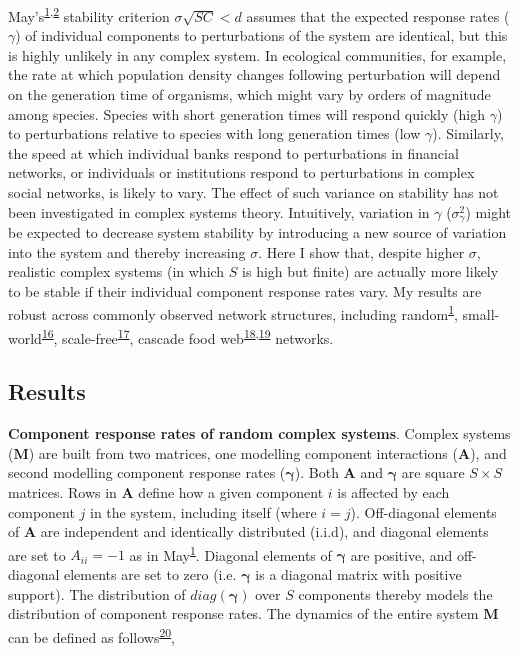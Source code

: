 \documentclass[]{article}
\begin{document}
May's\textsuperscript{\protect\hyperlink{ref-May1972}{1},\protect\hyperlink{ref-Allesina2012}{2}}
stability criterion \(\sigma\sqrt{SC} < d\) assumes that the expected
response rates (\(\gamma\)) of individual components to perturbations of
the system are identical, but this is highly unlikely in any complex
system. In ecological communities, for example, the rate at which
population density changes following perturbation will depend on the
generation time of organisms, which might vary by orders of magnitude
among species. Species with short generation times will respond quickly
(high \(\gamma\)) to perturbations relative to species with long
generation times (low \(\gamma\)). Similarly, the speed at which
individual banks respond to perturbations in financial networks, or
individuals or institutions respond to perturbations in complex social
networks, is likely to vary. The effect of such variance on stability
has not been investigated in complex systems theory. Intuitively,
variation in \(\gamma\) (\(\sigma^{2}_{\gamma}\)) might be expected to
decrease system stability by introducing a new source of variation into
the system and thereby increasing \(\sigma\). Here I show that, despite
higher \(\sigma\), realistic complex systems (in which \(S\) is high but
finite) are actually more likely to be stable if their individual
component response rates vary. My results are robust across commonly
observed network structures, including
random\textsuperscript{\protect\hyperlink{ref-May1972}{1}},
small-world\textsuperscript{\protect\hyperlink{ref-Watts1998}{16}},
scale-free\textsuperscript{\protect\hyperlink{ref-Albert2002}{17}},
cascade food
web\textsuperscript{\protect\hyperlink{ref-Solow1998}{18},\protect\hyperlink{ref-Williams2000}{19}}
networks.

\subsection{Results}\label{results}

\textbf{Component response rates of random complex systems}. Complex
systems (\(\mathbf{M}\)) are built from two matrices, one modelling
component interactions (\(\mathbf{A}\)), and second modelling component
response rates (\(\boldsymbol{\gamma}\)). Both \(\mathbf{A}\) and
\(\boldsymbol{\gamma}\) are square \(S \times S\) matrices. Rows in
\(\mathbf{A}\) define how a given component \(i\) is affected by each
component \(j\) in the system, including itself (where \(i = j\)).
Off-diagonal elements of \(\mathbf{A}\) are independent and identically
distributed (i.i.d), and diagonal elements are set to \(A_{ii} = -1\) as
in May\textsuperscript{\protect\hyperlink{ref-May1972}{1}}. Diagonal
elements of \(\boldsymbol{\gamma}\) are positive, and off-diagonal
elements are set to zero (i.e. \(\boldsymbol{\gamma}\) is a diagonal
matrix with positive support). The distribution of
\(diag(\boldsymbol{\gamma})\) over \(S\) components thereby models the
distribution of component response rates. The dynamics of the entire
system \(\mathbf{M}\) can be defined as
follows\textsuperscript{\protect\hyperlink{ref-Patel2018}{20}},
\end{document}
